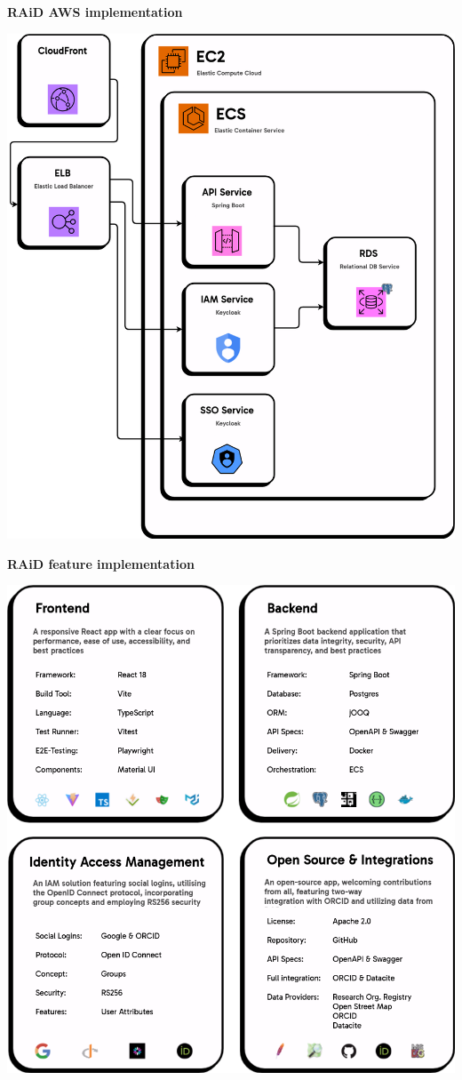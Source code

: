 \documentclass[a0,portrait]{a0poster}
\newenvironment{Figure}
  {\par\medskip\noindent\minipage{\linewidth}}
  {\endminipage\par\medskip}
\begin{document}
\begin{multicols}{3}
\vspace{1cm}

\centerline{\textbf{RAiD AWS implementation}}
\begin{Figure}
  \centering
  \includegraphics[width=0.75\linewidth]{figures/20241023-raid-architecture-appflow-aws.png}
  \label{aws-architecture}
\end{Figure}

\vspace{1cm}

\centerline{\textbf{RAiD feature implementation}}
\begin{Figure}
  \centering
  \includegraphics[width=0.75\linewidth]{figures/20241023-raid-architecture-feature-boxes.png}
  \label{aws-architecture}
\end{Figure}



\end{multicols}
\end{document}
